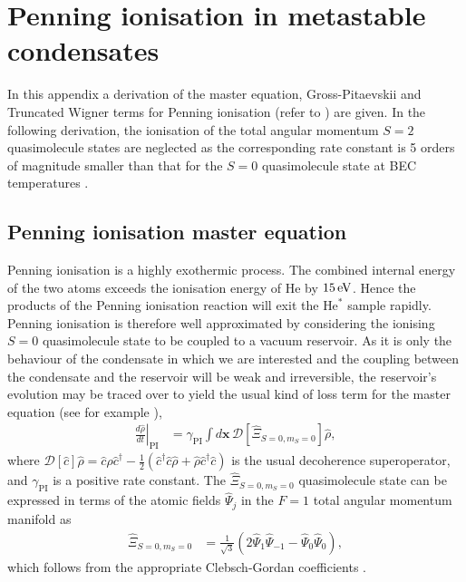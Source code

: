 \chapter{Penning ionisation in metastable condensates}
\label{PenningIonisationAppendix}
\graphicspath{{Figures/PenningIonisationAppendix/}{Figures/Common/}}

In this appendix a derivation of the master equation, Gross-Pitaevskii and Truncated Wigner terms for Penning ionisation (refer to ) are given. In the following derivation, the ionisation of the total angular momentum $S=2$ quasimolecule states are neglected as the corresponding rate constant is 5 orders of magnitude smaller than that for the $S=0$ quasimolecule state at BEC temperatures \citep{Shlyapnikov:1994}.

\section{Penning ionisation master equation}
\label{PenningIonisationAppendix:MasterEquation}

Penning ionisation is a highly exothermic process. The combined internal energy of the two atoms exceeds the ionisation energy of $\text{He}$ by $\unit[15]{eV}$. Hence the products of the Penning ionisation reaction will exit the $\text{He}^*$ sample rapidly. Penning ionisation is therefore well approximated by considering the ionising $S=0$ quasimolecule state to be coupled to a vacuum reservoir. As it is only the behaviour of the condensate in which we are interested and the coupling between the condensate and the reservoir will be weak and irreversible, the reservoir's evolution may be traced over to yield the usual kind of loss term for the master equation (see for example \citep[Chapter 8]{Scully}),
\begin{align}
    \label{PenningIonisationAppendix:MasterEquationTermArbitraryConstant}
    \left.\frac{d \hat{\rho}}{d t}\right|_\text{PI} &= \gamma_\text{PI} \int d \bm{x}\, \mathcal{D}\left[ \hat{\Xi}_{S=0, m_S=0}\right] \hat{\rho},
\end{align}
where $\mathcal{D}[\hat{c}]\hat{\rho} = \hat{c}\hat{\rho}\hat{c}^\dagger - \frac{1}{2}(\hat{c}^\dagger \hat{c} \hat{\rho} + \hat{\rho}\hat{c}^\dagger \hat{c})$ is the usual decoherence superoperator, and $\gamma_\text{PI}$ is a positive rate constant. The $\hat{\Xi}_{S=0, m_S=0}$ quasimolecule state can be expressed in terms of the atomic fields $\hat{\Psi}_j$ in the $F=1$ total angular momentum manifold as
\begin{align}
    \hat{\Xi}_{S=0, m_S=0} &= \frac{1}{\sqrt{3}} \left( 2 \hat{\Psi}_1 \hat{\Psi}_{-1} - \hat{\Psi}_0 \hat{\Psi}_0\right),
    \label{PenningIonisationAppendix:S0Quasimolecule}
\end{align}
which follows from the appropriate Clebsch-Gordan coefficients \citep{Ho:1998}.

